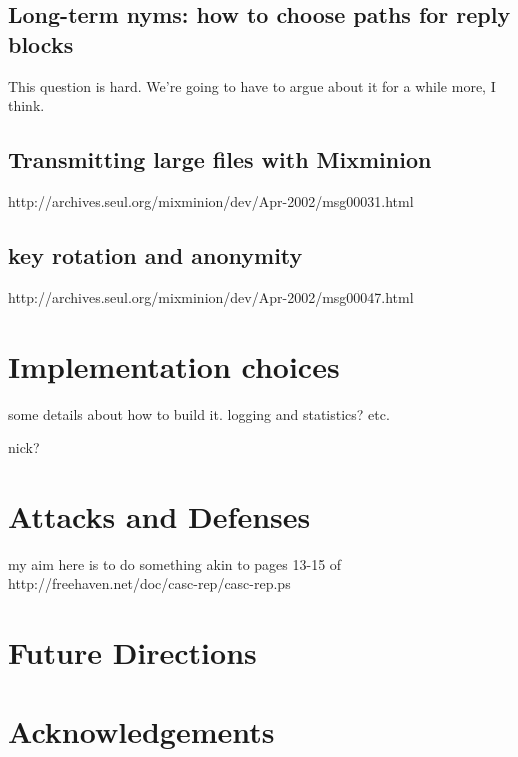 \documentclass{llncs}
\begin{document}
\subsection{Long-term nyms: how to choose paths for reply blocks}

This question is hard. We're going to have to argue about it for a
while more, I think.

\subsection{Transmitting large files with Mixminion}

http://archives.seul.org/mixminion/dev/Apr-2002/msg00031.html

\subsection{key rotation and anonymity}

http://archives.seul.org/mixminion/dev/Apr-2002/msg00047.html


\section{Implementation choices}
\label{sec:implementation}

some details about how to build it. logging and statistics? etc.

nick?


\section{Attacks and Defenses}
\label{sec:attacks}

my aim here is to do something akin to pages 13-15 of
http://freehaven.net/doc/casc-rep/casc-rep.ps


\section{Future Directions}
\label{sec:conclusion}


\section*{Acknowledgements}


 
\end{document}
